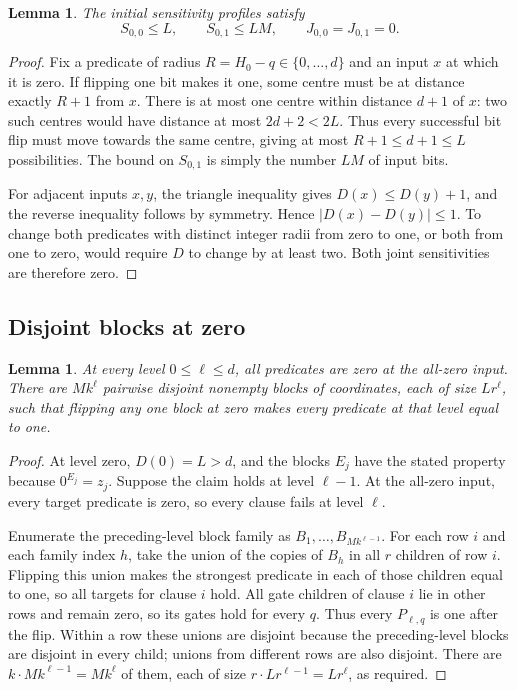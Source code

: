 \documentclass[11pt]{article}
\newtheorem{lemma}[theorem]{Lemma}
\theoremstyle{definition}
\theoremstyle{remark}
\begin{document}
\begin{lemma}\label{lem:base}
The initial sensitivity profiles satisfy
\begin{equation}\label{eq:base-profile}
 S_{0,0}\le L,\qquad S_{0,1}\le LM,\qquad
 J_{0,0}=J_{0,1}=0.
\end{equation}
\end{lemma}
\begin{proof}
Fix a predicate of radius \(R=H_0-q\in\{0,\ldots,d\}\) and an
input \(x\) at which it is zero. If flipping one bit makes it one,
some centre must be at distance exactly \(R+1\) from \(x\).
There is at most one centre within distance \(d+1\) of \(x\):
two such centres would have distance at most \(2d+2<2L\).
Thus every successful bit flip must move towards the same centre,
giving at most \(R+1\le d+1\le L\) possibilities.
The bound on \(S_{0,1}\) is simply the number \(LM\) of input bits.

For adjacent inputs \(x,y\), the triangle inequality gives
\(D(x)\le D(y)+1\), and the reverse inequality follows by symmetry.
Hence \(|D(x)-D(y)|\le1\). To change both predicates with distinct
integer radii from zero to one, or both from one to zero, would require
\(D\) to change by at least two. Both joint sensitivities are therefore
zero.
\end{proof}

\subsection{Disjoint blocks at zero}
\begin{lemma}\label{lem:blocks}
At every level \(0\le\ell\le d\), all predicates are zero at the
all-zero input. There are \(Mk^\ell\) pairwise disjoint nonempty blocks
of coordinates, each of size \(Lr^\ell\), such that flipping any one
block at zero makes every predicate at that level equal to one.
\end{lemma}
\begin{proof}
At level zero, \(D(0)=L>d\), and the blocks \(E_j\) have the stated
property because \(0^{E_j}=z_j\).
Suppose the claim holds at level \(\ell-1\). At the all-zero input,
every target predicate is zero, so every clause fails at level \(\ell\).

Enumerate the preceding-level block family as
\(B_1,\ldots,B_{Mk^{\ell-1}}\).
For each row \(i\) and each family index \(h\), take the union of the
copies of \(B_h\) in all \(r\) children of row \(i\).
Flipping this union makes the strongest predicate in each of those
children equal to one, so all targets for clause \(i\) hold.
All gate children of clause \(i\) lie in other rows and remain zero,
so its gates hold for every \(q\).
Thus every \(P_{\ell,q}\) is one after the flip.
Within a row these unions are disjoint because the preceding-level
blocks are disjoint in every child; unions from different rows are
also disjoint. There are \(k\cdot Mk^{\ell-1}=Mk^\ell\) of them,
each of size \(r\cdot Lr^{\ell-1}=Lr^\ell\), as required.
\end{proof}
\end{document}
